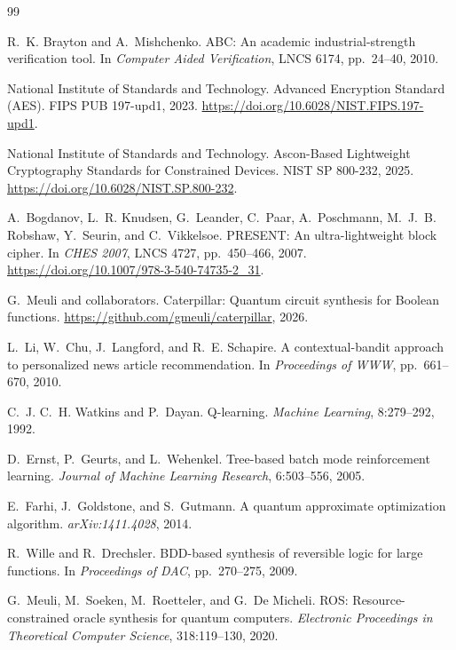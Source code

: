 \documentclass[UTF8,fontset=fandol,11pt]{ctexart}
\begin{document}
\begin{thebibliography}{99}

R.~K. Brayton and A.~Mishchenko.
\newblock ABC: An academic industrial-strength verification tool.
\newblock In \emph{Computer Aided Verification}, LNCS 6174, pp.~24--40, 2010.

National Institute of Standards and Technology.
\newblock Advanced Encryption Standard (AES).
\newblock FIPS PUB 197-upd1, 2023. \url{https://doi.org/10.6028/NIST.FIPS.197-upd1}.

National Institute of Standards and Technology.
\newblock Ascon-Based Lightweight Cryptography Standards for Constrained Devices.
\newblock NIST SP 800-232, 2025. \url{https://doi.org/10.6028/NIST.SP.800-232}.

A.~Bogdanov, L.~R. Knudsen, G.~Leander, C.~Paar, A.~Poschmann,
M.~J.~B. Robshaw, Y.~Seurin, and C.~Vikkelsoe.
\newblock PRESENT: An ultra-lightweight block cipher.
\newblock In \emph{CHES 2007}, LNCS 4727, pp.~450--466, 2007.
\newblock \url{https://doi.org/10.1007/978-3-540-74735-2_31}.

G.~Meuli and collaborators.
\newblock Caterpillar: Quantum circuit synthesis for Boolean functions.
\newblock \url{https://github.com/gmeuli/caterpillar}, 2026.

L.~Li, W.~Chu, J.~Langford, and R.~E. Schapire.
\newblock A contextual-bandit approach to personalized news article recommendation.
\newblock In \emph{Proceedings of WWW}, pp.~661--670, 2010.

C.~J. C.~H. Watkins and P.~Dayan.
\newblock Q-learning.
\newblock \emph{Machine Learning}, 8:279--292, 1992.

D.~Ernst, P.~Geurts, and L.~Wehenkel.
\newblock Tree-based batch mode reinforcement learning.
\newblock \emph{Journal of Machine Learning Research}, 6:503--556, 2005.

E.~Farhi, J.~Goldstone, and S.~Gutmann.
\newblock A quantum approximate optimization algorithm.
\newblock \emph{arXiv:1411.4028}, 2014.

R.~Wille and R.~Drechsler.
\newblock BDD-based synthesis of reversible logic for large functions.
\newblock In \emph{Proceedings of DAC}, pp.~270--275, 2009.

G.~Meuli, M.~Soeken, M.~Roetteler, and G.~De Micheli.
\newblock ROS: Resource-constrained oracle synthesis for quantum computers.
\newblock \emph{Electronic Proceedings in Theoretical Computer Science}, 318:119--130, 2020.


\end{thebibliography}
\end{document}
